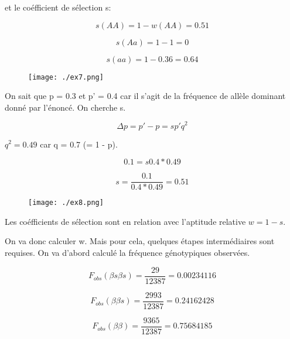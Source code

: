 \documentclass{article}
\begin{document}
et le coéfficient de sélection s:

\begin{equation}
s(AA) = 1 - w(AA) = 0.51
\end{equation}

\begin{equation}
s(Aa) = 1 - 1 = 0
\end{equation}

\begin{equation}
s(aa) = 1 - 0.36 = 0.64
\end{equation}


\begin{figure}[H]
\texttt{[image: ./ex7.png]}
\end{figure}

On sait que p = 0.3 et p' = 0.4 car il s'agit de la fréquence de allèle dominant donné par l'énoncé. On cherche s.

\begin{equation}
\Delta p = p' - p = sp'q^2
\end{equation}

$q^2 = 0.49$ car q = 0.7 (= 1 - p).

\begin{equation}
0.1 = s 0.4 * 0.49
\end{equation}

\begin{equation}
s = \frac{0.1}{0.4*0.49} = 0.51
\end{equation}


\begin{figure}[H]
\texttt{[image: ./ex8.png]}
\end{figure}

Les coéfficients de sélection sont en relation avec l'aptitude relative $w = 1- s$.

On va donc calculer w. Mais pour cela, quelques étapes intermédiaires sont requises. On va d'abord calculé la fréquence génotypiques observées.

\begin{equation}
F_{obs}(\beta s \beta s) = \frac{29}{12387} = 0.00234116
\end{equation}

\begin{equation}
F_{obs}(\beta\beta s) = \frac{2993}{12387} = 0.24162428
\end{equation}

\begin{equation}
F_{obs}(\beta\beta) = \frac{9365}{12387} = 0.75684185
\end{equation}
\end{document}

